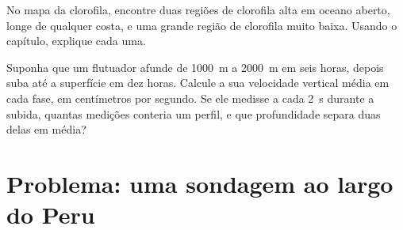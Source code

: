 \begin{exercise}[$\star\star\star$]\label{exo:g10:layered-ocean:14}
No mapa da clorofila, encontre duas regiões de clorofila alta em oceano
aberto, longe de qualquer costa, e uma grande região de clorofila muito
baixa. Usando o capítulo, explique cada uma.
\end{exercise}

\begin{exercise}[$\star\star\star$]\label{exo:g10:layered-ocean:15}
Suponha que um flutuador afunde de \qty{1000}{m} a \qty{2000}{m} em seis
horas, depois suba até a superfície em dez horas. Calcule a sua velocidade
vertical média em cada fase, em centímetros por segundo. Se ele medisse a
cada \qty{2}{s} durante a subida, quantas medições conteria um perfil, e que
profundidade separa duas delas em média?
\end{exercise}

\section{Problema: uma sondagem ao largo do Peru}

